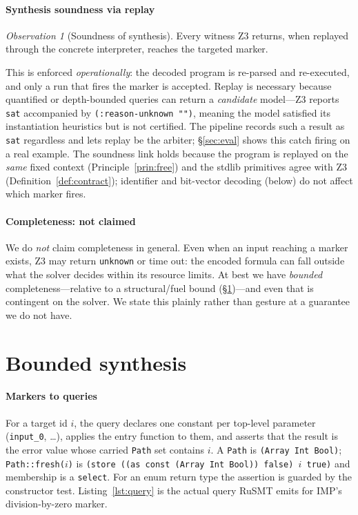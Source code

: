 \documentclass[sigplan,review,anonymous]{acmart}
\theoremstyle{definition}
\theoremstyle{remark}
\newtheorem{observation}{Observation}
\newcommand{\rusmt}{RuSMT}
\newcommand{\imp}{IMP}
\newcommand{\code}[1]{\texttt{#1}}
\begin{document}
\paragraph{Synthesis soundness via replay}
\begin{observation}[Soundness of synthesis]
Every witness Z3 returns, when replayed through the concrete interpreter, reaches
the targeted marker.
\end{observation}
This is enforced \emph{operationally}: the decoded program is re-parsed and
re-executed, and only a run that fires the marker is accepted. Replay is
necessary because quantified or depth-bounded queries can return a
\emph{candidate} model---Z3 reports \code{sat} accompanied by
\code{(:reason-unknown "")}, meaning the model satisfied its instantiation
heuristics but is not certified. The pipeline records such a result as \code{sat}
regardless and lets replay be the arbiter; \S\ref{sec:eval} shows this catch
firing on a real example. The soundness link holds because the program is
replayed on the \emph{same} fixed context (Principle~\ref{prin:free}) and the
stdlib primitives agree with Z3 (Definition~\ref{def:contract}); identifier and
bit-vector decoding (below) do not affect which marker fires.

\paragraph{Completeness: not claimed}
We do \emph{not} claim completeness in general. Even when an input reaching a
marker exists, Z3 may return \code{unknown} or time out: the encoded formula can
fall outside what the solver decides within its resource limits. At best we have
\emph{bounded} completeness---relative to a structural/fuel bound
(\S\ref{sec:synthesis})---and even that is contingent on the solver. We state this
plainly rather than gesture at a guarantee we do not have.

\section{Bounded synthesis}
\label{sec:synthesis}

\paragraph{Markers to queries}
For a target id $i$, the query declares one constant per top-level parameter
(\code{input\_0}, \dots), applies the entry function to them, and asserts that the
result is the error value whose carried \code{Path} set contains $i$. A
\code{Path} is \code{(Array Int Bool)}; \code{Path::fresh($i$)} is
\code{(store ((as const (Array Int Bool)) false) $i$ true)} and membership is a
\code{select}. For an enum return type the assertion is guarded by the constructor
test. Listing~\ref{lst:query} is the actual query \rusmt{} emits for \imp{}'s
division-by-zero marker.
\end{document}
